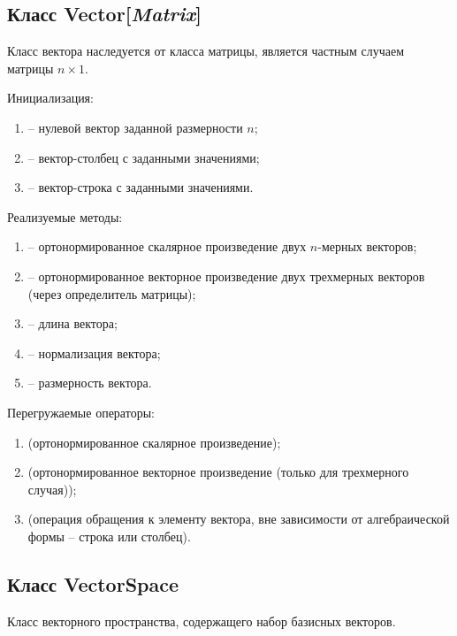 \subsection{Класс Vector[\textit{Matrix}]}
	\noindent Класс вектора наследуется от класса матрицы, является частным случаем матрицы $n \times 1$.

	\noindent Инициализация:
	\begin{enumerate}
		\item {} -- нулевой вектор заданной размерности \( n \);
		\item {} -- вектор-столбец с заданными значениями;
		\item {} -- вектор-строка с заданными значениями.
	\end{enumerate}

	\noindent Реализуемые методы:
	\begin{enumerate}
		\item {} -- ортонормированное скалярное произведение двух $n$-мерных векторов;
		\item {} -- ортонормированное векторное произведение двух трехмерных векторов (через определитель матрицы);
		\item {} -- длина вектора;
		\item {} -- нормализация вектора;
		\item {} -- размерность вектора.
	\end{enumerate}

	\noindent Перегружаемые операторы:
	\begin{enumerate}
		\item {} (ортонормированное скалярное произведение);
		\item {} (ортонормированное векторное произведение (только для трехмерного случая));
		\item {} (операция обращения к элементу вектора, вне зависимости от алгебраической формы -- строка или столбец).
	\end{enumerate}

\subsection{Класс VectorSpace}
	\noindent Класс векторного пространства, содержащего набор базисных векторов.

